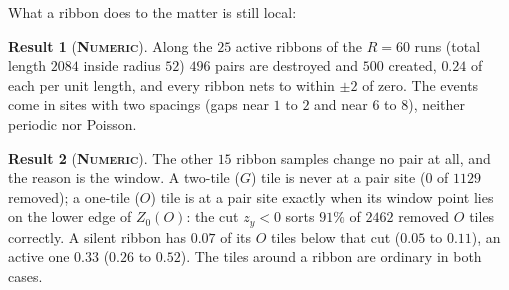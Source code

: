\documentclass[11pt]{article}
\newcommand{\numeric}{\textbf{\textsc{Numeric}}}
\theoremstyle{definition}
\newtheorem{result}{Result}
\begin{document}
What a ribbon does to the matter is still local:
\begin{result}[\numeric]\label{res:ribbon-pairs}
Along the $25$ active ribbons of the $R=60$ runs (total length $2084$ inside radius $52$) $496$ pairs are destroyed and $500$ created, $0.24$ of each per unit length, and every ribbon nets to within $\pm2$ of zero. The events come in sites with two spacings (gaps near $1$ to $2$ and near $6$ to $8$), neither periodic nor Poisson.
\end{result}
\begin{result}[\numeric]\label{res:silent}
The other $15$ ribbon samples change no pair at all, and the reason is the window. A two-tile ($G$) tile is never at a pair site ($0$ of $1129$ removed); a one-tile ($O$) tile is at a pair site exactly when its window point lies on the lower edge of $Z_0(O)$: the cut $z_y<0$ sorts $91\%$ of $2462$ removed $O$ tiles correctly. A silent ribbon has $0.07$ of its $O$ tiles below that cut ($0.05$ to $0.11$), an active one $0.33$ ($0.26$ to $0.52$). The tiles around a ribbon are ordinary in both cases.
\end{result}
\end{document}
